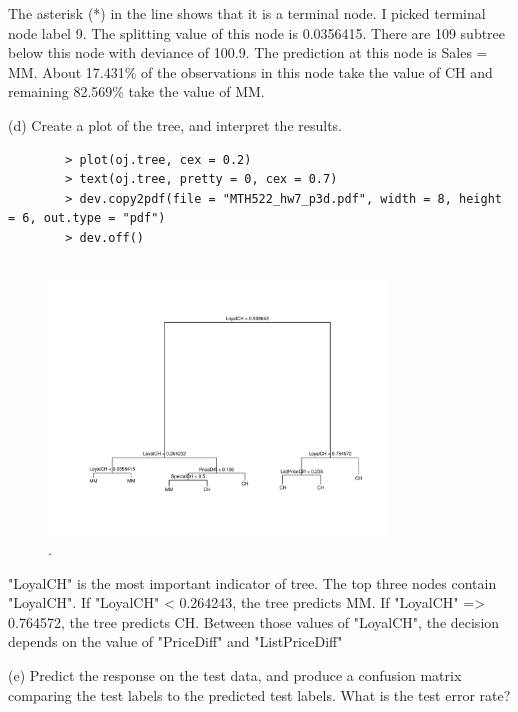 \documentclass{article}
\begin{document}
The asterisk (*) in the line shows that it is a terminal node.
I picked terminal node label 9. The splitting value of this node is 0.0356415. There are 109 subtree below this node with deviance of 100.9. The prediction at this node is Sales = MM. About  17.431\% of the observations in this node take the value of CH and remaining 82.569\% take the value of MM.


\newpage


(d) Create a plot of the tree, and interpret the results.\\

\begin{program}
	\begin{verbatim}
		> plot(oj.tree, cex = 0.2)
		> text(oj.tree, pretty = 0, cex = 0.7)
		> dev.copy2pdf(file = "MTH522_hw7_p3d.pdf", width = 8, height = 6, out.type = "pdf")
		> dev.off()
		
	\end{verbatim}
\end{program}

\begin{figure}[htb]
	\begin{center}
		\includegraphics[width=0.8\textwidth]{MTH522_hw7_p3d.pdf}
	\end{center}
	\caption{.}
	\label{fig:MTH522_hw7_p3d}
\end{figure}

"LoyalCH" is the most important indicator of tree. The top three nodes contain "LoyalCH". If  "LoyalCH" < 0.264243, the tree predicts MM. If  "LoyalCH" => 0.764572, the tree predicts CH. Between those values of "LoyalCH", the decision depends  on the value of "PriceDiff" and "ListPriceDiff"

\newpage


(e) Predict the response on the test data, and produce a confusion matrix comparing the test labels to the predicted test labels. What is the test error rate?\\
\end{document}
